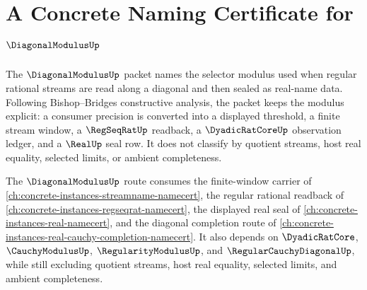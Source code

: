 \chapter{A Concrete Naming Certificate for $\DiagonalModulusUp$}
\label{ch:concrete-instances-diagonalmodulus-namecert}

The $\DiagonalModulusUp$ packet names the selector modulus used when regular rational streams are read along a diagonal and then sealed as real-name data. Following Bishop--Bridges constructive analysis, the packet keeps the modulus explicit: a consumer precision is converted into a displayed threshold, a finite stream window, a $\RegSeqRatUp$ readback, a $\DyadicRatCoreUp$ observation ledger, and a $\RealUp$ seal row. It does not classify by quotient streams, host real equality, selected limits, or ambient completeness.

The $\DiagonalModulusUp$ route consumes the finite-window carrier of \autoref{ch:concrete-instances-streamname-namecert}, the regular rational readback of \autoref{ch:concrete-instances-regseqrat-namecert}, the displayed real seal of \autoref{ch:concrete-instances-real-namecert}, and the diagonal completion route of \autoref{ch:concrete-instances-real-cauchy-completion-namecert}. It also depends on $\DyadicRatCore$, $\CauchyModulusUp$, $\RegularityModulusUp$, and $\RegularCauchyDiagonalUp$, while still excluding quotient streams, host real equality, selected limits, and ambient completeness.

